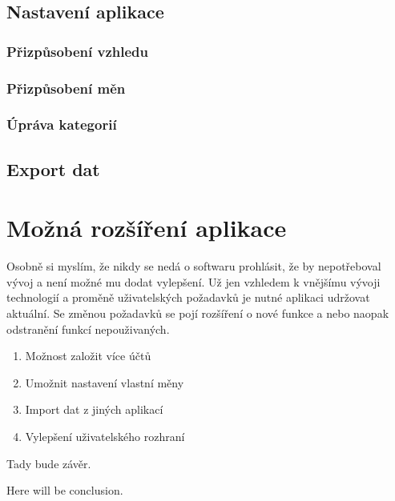 \documentclass[
  biblatex,
  figures=true,
  tables=false,
  glossaries,
  index
]{kidiplom}
\begin{document}
\subsection{Nastavení aplikace}

\subsubsection{Přizpůsobení vzhledu}

\subsubsection{Přizpůsobení měn}

\subsubsection{Úpráva kategorií}

\subsection{Export dat}


\section{Možná rozšíření aplikace}
Osobně si myslím, že nikdy se nedá o softwaru prohlásit, že by nepotřeboval vývoj a není možné mu dodat vylepšení. Už jen vzhledem k vnějšímu vývoji technologií a proměně uživatelských požadavků je nutné aplikaci udržovat aktuální. Se změnou požadavků se pojí rozšíření o nové funkce a nebo naopak odstranění funkcí nepouživaných.

\begin{enumerate}
  \item Možnost založit více účtů
  \item Umožnit nastavení vlastní měny
  \item Import dat z jiných aplikací
  \item Vylepšení uživatelského rozhraní
\end{enumerate}

\begin{kiconclusions}
Tady bude závěr.
\end{kiconclusions}

\begin{kiconclusions}[english]
Here will be conclusion.
\end{kiconclusions}

\end{document}
